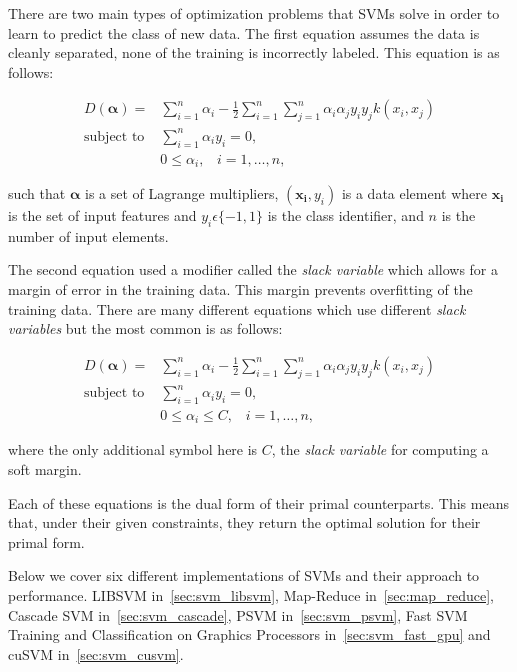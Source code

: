 There are two main types of optimization problems that SVMs solve in order to learn to predict the class of new data. The first equation assumes the data is cleanly separated, none of the training is incorrectly labeled. This equation is as follows:

\begin{align}
D(\bm{\alpha}) = &\sum_{i=1}^n \alpha_i - \frac{1}{2} \sum_{i=1}^n \sum_{j=1}^n \alpha_i \alpha_j y_i y_j k(x_i, x_j) \nonumber \\
\text{subject to} \: &\sum_{i=1}^n \alpha_i y_i = 0,\\
&0 \le \alpha_i, \;\;\; i=1,\ldots,n, \nonumber
\label{eq:svm}
\end{align}

\noindent such that $\bm{\alpha}$ is a set of Lagrange multipliers, $(\bm{x_i}, y_i)$ is a data element where $\bm{x_i}$ is the set of input features and $y_i \epsilon \{-1,1\}$ is the class identifier, and $n$ is the number of input elements.

The second equation used a modifier called the \emph{slack variable} which allows for a margin of error in the training data. This margin prevents overfitting of the training data. There are many different equations which use different \emph{slack variables} but the most common is as follows:

\begin{align}
D(\bm{\alpha}) = &\sum_{i=1}^n \alpha_i - \frac{1}{2} \sum_{i=1}^n \sum_{j=1}^n \alpha_i \alpha_j y_i y_j k(x_i, x_j) \nonumber \\
\text{subject to} \: &\sum_{i=1}^n \alpha_i y_i = 0,\\
&0 \le \alpha_i \le C, \;\;\; i=1,\ldots,n, \nonumber
\label{eq:c_svm}
\end{align}

\noindent where the only additional symbol here is $C$, the \emph{slack variable} for computing a soft margin.

Each of these equations is the dual form of their primal counterparts. This means that, under their given constraints, they return the optimal solution for their primal form.

Below we cover six different implementations of SVMs and their approach to performance. LIBSVM in~\ref{sec:svm_libsvm}, Map-Reduce in~\ref{sec:map_reduce}, Cascade SVM in~\ref{sec:svm_cascade}, PSVM in~\ref{sec:svm_psvm}, Fast SVM Training and Classification on Graphics Processors in~\ref{sec:svm_fast_gpu} and cuSVM in~\ref{sec:svm_cusvm}.


